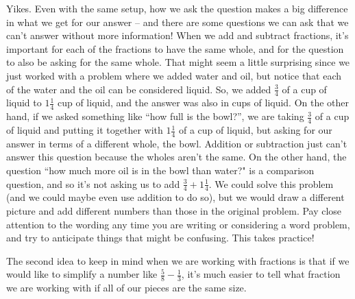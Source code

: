 \documentclass{ximera}
\begin{document}
Yikes. Even with the same setup, how we ask the question makes a big difference in what we get for our answer -- and there are some questions we can ask that we can't answer without more information! When we add and subtract fractions, it's important for each of the fractions to have the same whole, and for the question to also be asking for the same whole. That might seem a little surprising since we just worked with a problem where we added water and oil, but notice that each of the water and the oil can be considered liquid. So, we added $\frac{3}{4}$ of a cup of liquid to $1 \frac{1}{4}$ cup of liquid, and the answer was also in cups of liquid. On the other hand, if we asked something like ``how full is the bowl?'', we are taking $\frac{3}{4}$ of a cup of liquid and putting it together with $1 \frac{1}{4}$ of a cup of liquid, but asking for our answer in terms of a different whole, the bowl. Addition or subtraction just can't answer this question because the wholes aren't the same. On the other hand, the question ``how much more oil is in the bowl than water?" is a comparison question, and so it's not asking us to add $\frac{3}{4} + 1 \frac{1}{4}$. We could solve this problem (and we could maybe even use addition to do so), but we would draw a different picture and add different numbers than those in the original problem. Pay close attention to the wording any time you are writing or considering a word problem, and try to anticipate things that might be confusing. This takes practice!

The second idea to keep in mind when we are working with fractions is that if we would like to simplify a number like $\frac{5}{8} - \frac{1}{3}$, it's much easier to tell what fraction we are working with if all of our pieces are the same size. 
\end{document}
